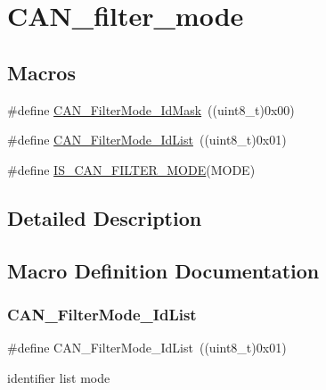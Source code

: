 \hypertarget{group___c_a_n__filter__mode}{}\section{C\+A\+N\+\_\+filter\+\_\+mode}
\label{group___c_a_n__filter__mode}
\subsection*{Macros}
\begin{DoxyCompactItemize}
\item 
\#define \mbox{\hyperlink{group___c_a_n__filter__mode_ga8136e518fb31fd91079e4c7c4c19c94b}{C\+A\+N\+\_\+\+Filter\+Mode\+\_\+\+Id\+Mask}}~((uint8\+\_\+t)0x00)
\item 
\#define \mbox{\hyperlink{group___c_a_n__filter__mode_ga91e9144f71b15ac345ee89314711c158}{C\+A\+N\+\_\+\+Filter\+Mode\+\_\+\+Id\+List}}~((uint8\+\_\+t)0x01)
\item 
\#define \mbox{\hyperlink{group___c_a_n__filter__mode_gae684565d5392c12fd333379e5ec840f8}{I\+S\+\_\+\+C\+A\+N\+\_\+\+F\+I\+L\+T\+E\+R\+\_\+\+M\+O\+DE}}(M\+O\+DE)
\end{DoxyCompactItemize}


\subsection{Detailed Description}


\subsection{Macro Definition Documentation}
\mbox{\label{group___c_a_n__filter__mode_ga91e9144f71b15ac345ee89314711c158}} 
\subsubsection{\texorpdfstring{CAN\_FilterMode\_IdList}{CAN\_FilterMode\_IdList}}
{\footnotesize\ttfamily \#define C\+A\+N\+\_\+\+Filter\+Mode\+\_\+\+Id\+List~((uint8\+\_\+t)0x01)}

identifier list mode \mbox{\label{group___c_a_n__filter__mode_ga8136e518fb31fd91079e4c7c4c19c94b}} 
